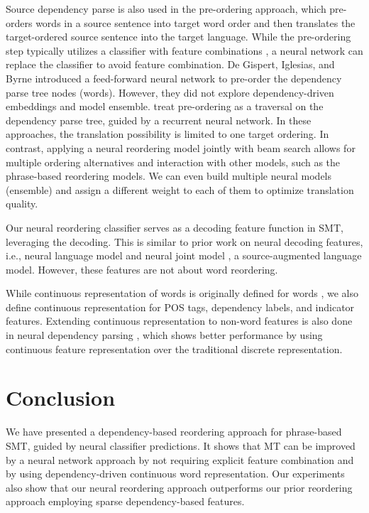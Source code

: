 \documentclass[letterpaper]{article}
\begin{document}
Source dependency parse is also used in the pre-ordering approach, which pre-orders words in a source sentence into target word order and then translates the target-ordered source sentence into the target language. While the pre-ordering step typically utilizes a classifier with feature combinations \cite{lerner_source-side_2013,jehl_source-side_2014}, a neural network can replace the classifier to avoid feature combination. De Gispert, Iglesias, and Byrne  introduced a feed-forward neural network to pre-order the dependency parse tree nodes (words). However, they did not explore dependency-driven embeddings and model ensemble. \citeauthor{miceli-barone_non-projective_2015}  treat pre-ordering as a traversal on the dependency parse tree, guided by a recurrent neural network. In these approaches, the translation possibility is limited to one target ordering. In contrast, applying a neural reordering model jointly with beam search allows for multiple ordering alternatives and interaction with other models, such as the phrase-based reordering models. We can even build multiple neural models (ensemble) and assign a different weight to each of them to optimize translation quality.

Our neural reordering classifier serves as a decoding feature function in SMT, leveraging the decoding. This is similar to prior work on neural decoding features, i.e., neural language model \cite{vaswani_decoding_2013} and neural joint model \cite{devlin_fast_2014}, a source-augmented language model. However, these features are not about word reordering.

While continuous representation of words is originally defined for words \cite{mikolov_efficient_2013}, we also define continuous representation for POS tags, dependency labels, and indicator features. Extending continuous representation to non-word features is also done in neural dependency parsing \cite{chen_fast_2014,andor_globally_2016}, which shows better performance by using continuous feature representation over the traditional discrete representation.

\section{Conclusion}

We have presented a dependency-based reordering approach for phrase-based SMT, guided by neural classifier predictions. It shows that MT can be improved by a neural network approach by not requiring explicit feature combination and by using dependency-driven continuous word representation. Our experiments also show that our neural reordering approach outperforms our prior reordering approach employing sparse dependency-based features.



\end{document}

